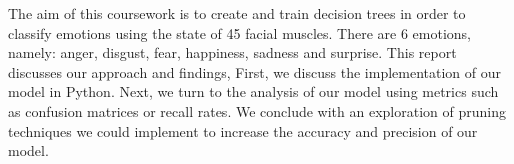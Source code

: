 The aim of this coursework is to create and train decision trees in order to classify emotions using the state of 45 facial muscles.
There are 6 emotions, namely: anger, disgust, fear, happiness, sadness and surprise.
This report discusses our approach and findings, 
First,  we discuss the implementation of our model in Python.
Next, we turn to the analysis of our model using metrics such as confusion matrices or recall rates.
We conclude with an exploration of pruning techniques we could implement to increase the accuracy and precision of our model.

